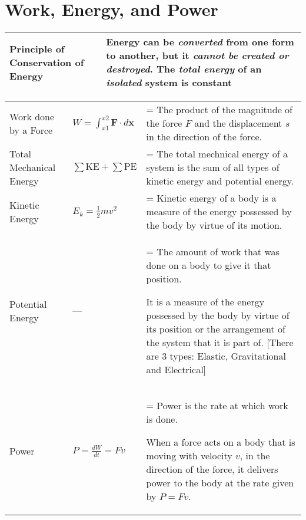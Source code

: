 \documentclass[a4paper]{article}
\newlength{\oldparskip}
\begin{document}
	\section{Work, Energy, and Power}
		\begin{center}
			\renewcommand{\arraystretch}{1.2}
			\begin{tabular}{@{} p{4.5cm} p{9.5cm} @{}}
				\toprule
				Principle of Conservation of Energy & Energy can be \textbf{\textit{converted}} from one form to another, but it \textbf{\textit{cannot be created or destroyed}}. The \textbf{\textit{total energy}} of an \textbf{\textit{isolated}} system is constant\\
				\bottomrule
			\end{tabular}
		\end{center}
		\begin{center}
			\renewcommand{\arraystretch}{1.2}
			\begin{tabular}{@{} l l >{\parskip=\oldparskip}p{7.5cm} @{}}
				\toprule
				Work done by a Force & $\displaystyle W=\int_{x1}^{x2} \textbf{F} \cdot d\textbf{x} $ & The product of the magnitude of the force $F$ and the displacement $s$ in the direction of the force. \\
				Total Mechanical Energy & $\sum \textrm{KE} + \sum \textrm{PE}$ & The total mechnical energy of a system is the sum of all types of kinetic energy and potential energy. \\
				Kinetic Energy & $E_k = \frac{1}{2}mv^2$ & Kinetic energy of a body is a measure of the energy possessed by the body by virtue of its motion.\\
				Potential Energy & --- & The amount of work that was done on a body to give it that position. \par It is a measure of the energy possessed by the body by virtue of its position or the arrangement of the system that it is part of. [There are 3 types: Elastic, Gravitational and Electrical]\\
				Power & $\displaystyle P=\frac{dW}{dt}=Fv$ & Power is the rate at which work is done. \par When a force acts on a body that is moving with velocity $v$, in the direction of the force, it delivers power to the body at the rate given by $P=Fv$.\\
				\bottomrule
			\end{tabular}
		\end{center}
\end{document}
